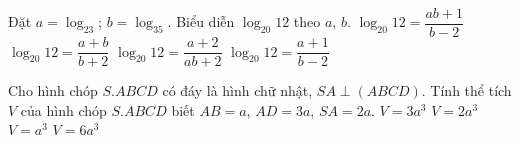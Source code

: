\begin{ex}	%
	Đặt $a=\log_23$; $b=\log_35$. Biểu diễn $\log_{20}12$ theo $a$, $b$.
	\choice
	{$\log_{20}12=\dfrac{ab+1}{b-2}$}
	{$\log_{20}12=\dfrac{a+b}{b+2}$}
	{\True $\log_{20}12=\dfrac{a+2}{ab+2}$}
	{$\log_{20}12=\dfrac{a+1}{b-2}$}
\end{ex}
\begin{ex}	%
	Cho hình chóp $S.ABCD$ có đáy là hình chữ nhật,  $SA\perp (ABCD)$. Tính thể tích $V$ của hình chóp $S.ABCD$ biết $AB=a$, $AD=3a$, $SA=2a$.
	\choice
	{$V=3a^3$}
	{\True $V=2a^3$}
	{$V=a^3$}
	{$V=6a^3$}
\end{ex}
